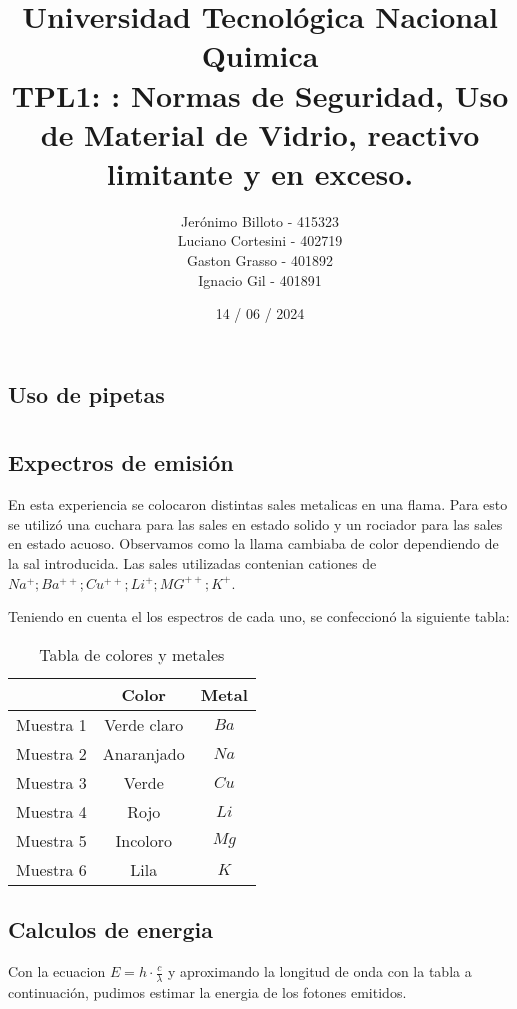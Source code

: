 \documentclass[12pt]{report}
\title{%
  \fontsize{25}{0}\selectfont Universidad Tecnológica Nacional \\
  \fontsize{22}{30}\selectfont Quimica \\
  \fontsize{18}{25}\selectfont TPL1: : Normas de Seguridad, Uso de Material de Vidrio, reactivo limitante y en exceso.
}
\author{
  Jerónimo Billoto - 415323\\
  Luciano Cortesini - 402719\\
  Gaston Grasso - 401892\\
  Ignacio Gil - 401891\\
}
\date{14 / 06 / 2024}
\begin{document}
\maketitle
\chapter{}
\section{Uso de pipetas}

\chapter{}
\section{Expectros de emisión}
En esta experiencia se colocaron distintas sales metalicas en una flama.
Para esto se utilizó una cuchara para las sales en estado solido y un rociador para las sales en 
estado acuoso.
Observamos como la llama cambiaba de color dependiendo de la sal introducida.
Las sales utilizadas contenian cationes de $Na^{+} ; Ba^{++} ; Cu^{++} ; Li^{+} ; MG^{++} ; K^{+}$.

Teniendo en cuenta el los espectros de cada uno, se confeccionó la siguiente tabla:

\begin{table}[h!]
\centering
\begin{tabular}{|c|c|c|}
  \hline
  \textbf{} & \textbf{Color} & \textbf{Metal} \\
  \hline
  Muestra 1 & Verde claro & $Ba$ \\
  \hline
  Muestra 2 & Anaranjado & $Na$\\
  \hline
  Muestra 3 & Verde & $Cu$ \\
  \hline
  Muestra 4 & Rojo & $Li$\\
  \hline
  Muestra 5 & Incoloro & $Mg$\\
  \hline
  Muestra 6 & Lila & $K$ \\
  \hline
\end{tabular}
\caption{Tabla de colores y metales}
\label{tab:colores_metales}
\end{table}

\section{Calculos de energia}
Con la ecuacion $E=h\cdot\frac{c}{\lambda}$ y aproximando la longitud de onda con la tabla a continuación,
pudimos estimar la energia de los fotones emitidos.
\end{document}
